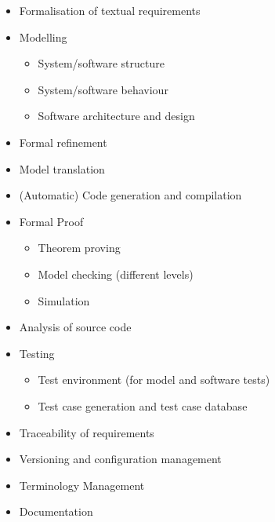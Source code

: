 \documentclass{./template/openetcs_report}
\begin{document}
\vspace{-10pt}
\begin{itemize}[topsep=2pt, partopsep=2pt,itemsep=2pt,parsep=2pt]
\item Formalisation of textual requirements
\item Modelling

	\begin{itemize}
	\item System/software structure
	\item System/software behaviour
	\item Software architecture and design
	\end{itemize}

\item Formal refinement
\item Model translation
\item (Automatic) Code generation and compilation
\item Formal Proof

	\begin{itemize}
	\item Theorem proving
	\item Model checking (different levels)
	\item Simulation
	\end{itemize}

\item Analysis of source code
\item Testing

	\begin{itemize}
	\item Test environment (for model and software tests)
	\item Test case generation and test case database
	\end{itemize}


\item Traceability of requirements
\item Versioning and configuration management
\item Terminology Management
\item Documentation
\end{itemize}
\end{document}
